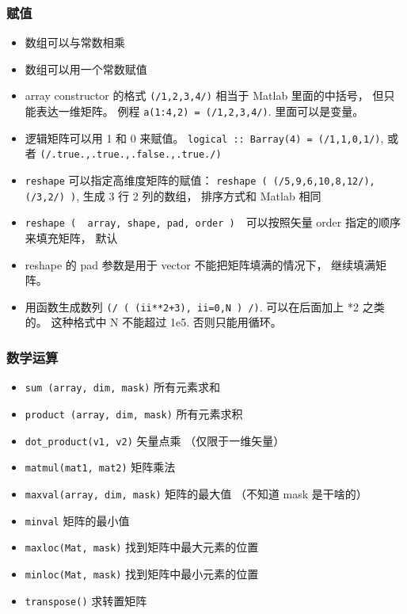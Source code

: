\subsubsection{赋值}
\begin{itemize}
\item 数组可以与常数相乘
\item 数组可以用一个常数赋值
\item array constructor 的格式 \verb`(/1,2,3,4/)` 相当于 Matlab 里面的中括号， 但只能表达一维矩阵。 例程 \verb`a(1:4,2) = (/1,2,3,4/)`. 里面可以是变量。
\item 逻辑矩阵可以用 1 和 0 来赋值。 \verb`logical :: Barray(4) = (/1,1,0,1/)`, 
   或者 \verb`(/.true.,.true.,.false.,.true./)`
\item \verb`reshape` 可以指定高维度矩阵的赋值： 
   \verb`reshape ( (/5,9,6,10,8,12/), (/3,2/) )`, 生成 3 行 2 列的数组， 排序方式和 Matlab 相同
\item \verb`reshape (  array, shape, pad, order )`　可以按照矢量 order 指定的顺序来填充矩阵， 默认
\item reshape 的 pad 参数是用于 vector 不能把矩阵填满的情况下， 继续填满矩阵。
\item 用函数生成数列  \verb`(/ ( (ii**2+3), ii=0,N ) /)`.  可以在后面加上 *2 之类的。 这种格式中 N 不能超过 1e5. 否则只能用循环。
\end{itemize}

\subsubsection{数学运算}
\begin{itemize}
\item \verb`sum (array, dim, mask)` 所有元素求和
\item \verb`product (array, dim, mask)` 所有元素求积
\item \verb`dot_product(v1, v2)` 矢量点乘 （仅限于一维矢量）
\item \verb`matmul(mat1, mat2)` 矩阵乘法
\item \verb`maxval(array, dim, mask)` 矩阵的最大值 （不知道 mask 是干啥的）
\item \verb`minval` 矩阵的最小值
\item \verb`maxloc(Mat, mask)` 找到矩阵中最大元素的位置
\item \verb`minloc(Mat, mask)` 找到矩阵中最小元素的位置
\item \verb`transpose()` 求转置矩阵
\end{itemize}

